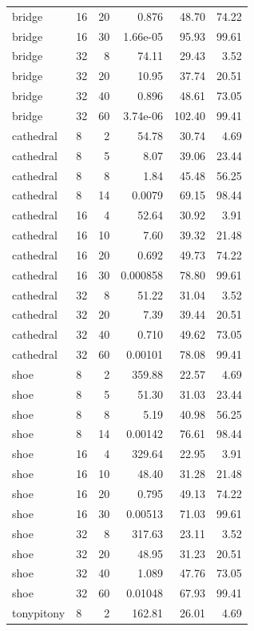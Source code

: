 \documentclass[11pt,a4paper]{article}
\begin{document}
\begin{longtable}{llrrrr}
bridge & 16 & 20 & 0.876 & 48.70 & 74.22 \\
bridge & 16 & 30 & 1.66e-05 & 95.93 & 99.61 \\
bridge & 32 & 8 & 74.11 & 29.43 & 3.52 \\
bridge & 32 & 20 & 10.95 & 37.74 & 20.51 \\
bridge & 32 & 40 & 0.896 & 48.61 & 73.05 \\
bridge & 32 & 60 & 3.74e-06 & 102.40 & 99.41 \\
cathedral & 8 & 2 & 54.78 & 30.74 & 4.69 \\
cathedral & 8 & 5 & 8.07 & 39.06 & 23.44 \\
cathedral & 8 & 8 & 1.84 & 45.48 & 56.25 \\
cathedral & 8 & 14 & 0.0079 & 69.15 & 98.44 \\
cathedral & 16 & 4 & 52.64 & 30.92 & 3.91 \\
cathedral & 16 & 10 & 7.60 & 39.32 & 21.48 \\
cathedral & 16 & 20 & 0.692 & 49.73 & 74.22 \\
cathedral & 16 & 30 & 0.000858 & 78.80 & 99.61 \\
cathedral & 32 & 8 & 51.22 & 31.04 & 3.52 \\
cathedral & 32 & 20 & 7.39 & 39.44 & 20.51 \\
cathedral & 32 & 40 & 0.710 & 49.62 & 73.05 \\
cathedral & 32 & 60 & 0.00101 & 78.08 & 99.41 \\
shoe & 8 & 2 & 359.88 & 22.57 & 4.69 \\
shoe & 8 & 5 & 51.30 & 31.03 & 23.44 \\
shoe & 8 & 8 & 5.19 & 40.98 & 56.25 \\
shoe & 8 & 14 & 0.00142 & 76.61 & 98.44 \\
shoe & 16 & 4 & 329.64 & 22.95 & 3.91 \\
shoe & 16 & 10 & 48.40 & 31.28 & 21.48 \\
shoe & 16 & 20 & 0.795 & 49.13 & 74.22 \\
shoe & 16 & 30 & 0.00513 & 71.03 & 99.61 \\
shoe & 32 & 8 & 317.63 & 23.11 & 3.52 \\
shoe & 32 & 20 & 48.95 & 31.23 & 20.51 \\
shoe & 32 & 40 & 1.089 & 47.76 & 73.05 \\
shoe & 32 & 60 & 0.01048 & 67.93 & 99.41 \\
tonypitony & 8 & 2 & 162.81 & 26.01 & 4.69 \\

\end{longtable}
\end{document}
